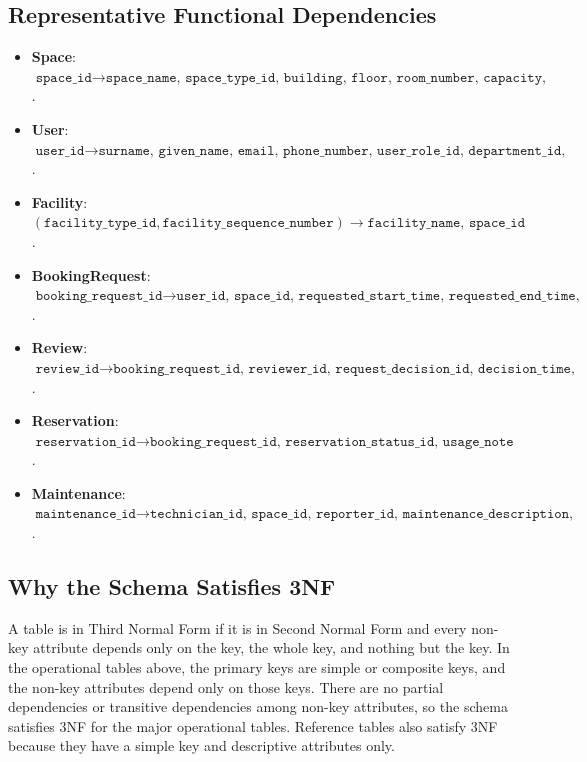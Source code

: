 \documentclass[12pt,a4paper]{article}
\begin{document}
\subsection{Representative Functional Dependencies}
\begin{itemize}
    \item \textbf{Space}: $\texttt{space\_id} \rightarrow \texttt{space\_name, space\_type\_id, building, floor, room\_number, capacity, space\_status\_id, space\_policy\_id}$. 
    \item \textbf{User}: $\texttt{user\_id} \rightarrow \texttt{surname, given\_name, email, phone\_number, user\_role\_id, department\_id, user\_status\_id}$. 
    \item \textbf{Facility}: $(\texttt{facility\_type\_id}, \texttt{facility\_sequence\_number}) \rightarrow \texttt{facility\_name, space\_id}$. 
    \item \textbf{BookingRequest}: $\texttt{booking\_request\_id} \rightarrow \texttt{user\_id, space\_id, requested\_start\_time, requested\_end\_time, purpose\_id, expected\_participants, request\_state\_id, advisory\_acknowledged}$. 
    \item \textbf{Review}: $\texttt{review\_id} \rightarrow \texttt{booking\_request\_id, reviewer\_id, request\_decision\_id, decision\_time, decision\_note, rejection\_reason}$. 
    \item \textbf{Reservation}: $\texttt{reservation\_id} \rightarrow \texttt{booking\_request\_id, reservation\_status\_id, usage\_note}$. 
    \item \textbf{Maintenance}: $\texttt{maintenance\_id} \rightarrow \texttt{technician\_id, space\_id, reporter\_id, maintenance\_description, maintenance\_start\_time, maintenance\_end\_time, maintenance\_status\_id, result\_note, maintenance\_impact\_level\_id}$. 
\end{itemize}

\subsection{Why the Schema Satisfies 3NF}
A table is in Third Normal Form if it is in Second Normal Form and every non-key attribute depends only on the key, the whole key, and nothing but the key. In the operational tables above, the primary keys are simple or composite keys, and the non-key attributes depend only on those keys. There are no partial dependencies or transitive dependencies among non-key attributes, so the schema satisfies 3NF for the major operational tables. Reference tables also satisfy 3NF because they have a simple key and descriptive attributes only.
\end{document}
